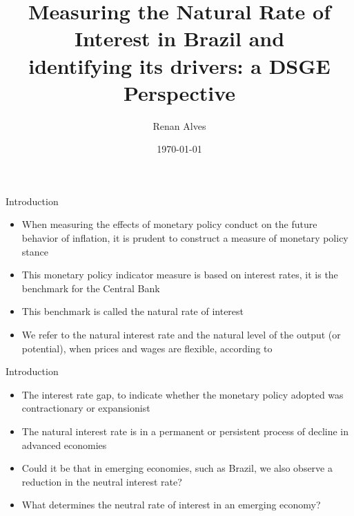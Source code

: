\documentclass[9pt]{beamer}
\title[Measuring the Natural Rate of Interest in Brazil]{Measuring the Natural Rate of Interest in Brazil and \\
identifying its drivers: a DSGE Perspective}
\author[Alves, R.]{Renan Alves} %
\institute[EESP-FGV] %
{Advisor: Prof. Dr. Marcel Ribeiro \\
Co-Advisor: Prof. Dr. Marcelo Kfoury %
}
\date{\today}
\begin{document}
\maketitle


\begin{frame}{Introduction}
\begin{itemize}

\item When measuring the effects of monetary policy conduct on the future behavior of inflation, it is prudent to construct a measure of monetary policy stance

\item This monetary policy indicator measure is based on interest rates, it is the benchmark for the Central Bank

\item This benchmark is called the natural rate of interest

\item We refer to the natural interest rate and the natural level of the output (or potential), when prices and wages are flexible, according to \textcolor{red}{\citet{Woodford:2003}}


\end{itemize}
\end{frame}
\begin{frame}{Introduction}
\begin{itemize}



\item The interest rate gap, to indicate whether the monetary policy adopted was contractionary or expansionist

\item The natural interest rate is in a permanent or persistent process of decline in advanced economies \textcolor{red}{\citet{Gali:2019}}

\item Could it be that in emerging economies, such as Brazil, we also observe a reduction in the neutral interest rate?

\item What determines the neutral rate of interest in an emerging economy?

\end{itemize}
\end{frame}
\end{document}

